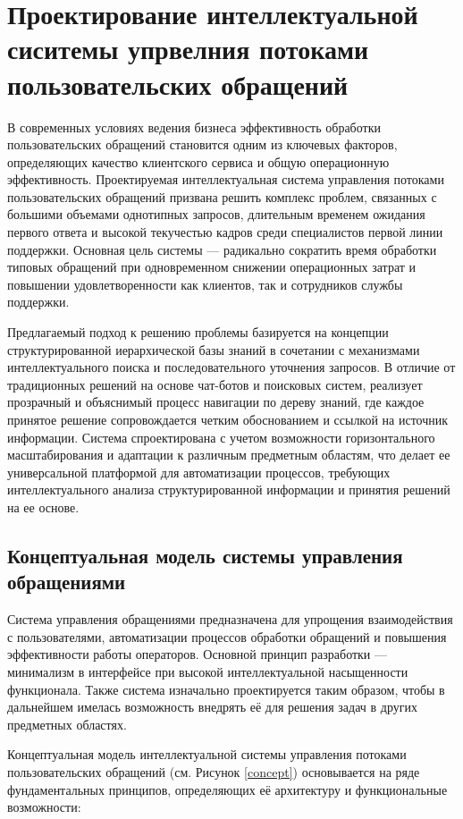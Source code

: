 \section{Проектирование интеллектуальной сиситемы упрвелния потоками пользовательских обращений}
\label{sec:designing}

В современных условиях ведения бизнеса эффективность обработки пользовательских обращений становится одним из ключевых факторов, определяющих качество клиентского сервиса и общую операционную эффективность. Проектируемая интеллектуальная система управления потоками пользовательских обращений призвана решить комплекс проблем, связанных с большими объемами однотипных запросов, длительным временем ожидания первого ответа и высокой текучестью кадров среди специалистов первой линии поддержки. Основная цель системы — радикально сократить время обработки типовых обращений при одновременном снижении операционных затрат и повышении удовлетворенности как клиентов, так и сотрудников службы поддержки.

Предлагаемый подход к решению проблемы базируется на концепции структурированной иерархической базы знаний в сочетании с механизмами интеллектуального поиска и последовательного уточнения запросов. В отличие от традиционных решений на основе чат-ботов и поисковых систем, реализует прозрачный и объяснимый процесс навигации по дереву знаний, где каждое принятое решение сопровождается четким обоснованием и ссылкой на источник информации. Система спроектирована с учетом возможности горизонтального масштабирования и адаптации к различным предметным областям, что делает ее универсальной платформой для автоматизации процессов, требующих интеллектуального анализа структурированной информации и принятия решений на ее основе.

\subsection{Концептуальная модель системы управления обращениями}

Система управления обращениями предназначена для упрощения взаимодействия с пользователями, автоматизации процессов обработки обращений и повышения эффективности работы операторов. Основной принцип разработки — минимализм в интерфейсе при высокой интеллектуальной насыщенности функционала. Также система изначально проектируется таким образом, чтобы в дальнейшем имелась возможность внедрять её для решения задач в других предметных областях.

Концептуальная модель интеллектуальной системы управления потоками пользовательских обращений (см. Рисунок \ref{concept}) основывается на ряде фундаментальных принципов, определяющих её архитектуру и функциональные возможности:

